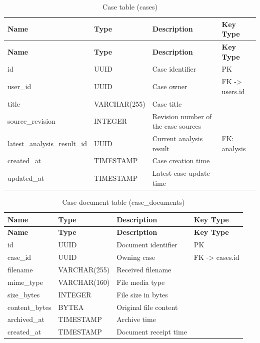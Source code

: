 \begin{longtable}{@{}>{\raggedright\arraybackslash}p{} >{\raggedright\arraybackslash}p{} >{\raggedright\arraybackslash}p{} >{\raggedright\arraybackslash}p{}@{}}
\caption{Case table (cases)}\label{tab:3-10}\\
\toprule
\textbf{Name} & \textbf{Type} & \textbf{Description} & \textbf{Key Type} \\
\midrule
\endfirsthead
\textbf{Name} & \textbf{Type} & \textbf{Description} & \textbf{Key Type} \\
\midrule
\endhead
id & UUID & Case identifier & PK \\
user\_id & UUID & Case owner & FK -> users.id \\
title & VARCHAR(255) & Case title &  \\
source\_revision & INTEGER & Revision number of the case sources &  \\
latest\_analysis\_result\_id & UUID & Current analysis result & FK: analysis \\
created\_at & TIMESTAMP & Case creation time &  \\
updated\_at & TIMESTAMP & Latest case update time &  \\
\bottomrule
\end{longtable}

\begin{longtable}{@{}>{\raggedright\arraybackslash}p{} >{\raggedright\arraybackslash}p{} >{\raggedright\arraybackslash}p{} >{\raggedright\arraybackslash}p{}@{}}
\caption{Case-document table (case\_documents)}\label{tab:3-11}\\
\toprule
\textbf{Name} & \textbf{Type} & \textbf{Description} & \textbf{Key Type} \\
\midrule
\endfirsthead
\textbf{Name} & \textbf{Type} & \textbf{Description} & \textbf{Key Type} \\
\midrule
\endhead
id & UUID & Document identifier & PK \\
case\_id & UUID & Owning case & FK -> cases.id \\
filename & VARCHAR(255) & Received filename &  \\
mime\_type & VARCHAR(160) & File media type &  \\
size\_bytes & INTEGER & File size in bytes &  \\
content\_bytes & BYTEA & Original file content &  \\
archived\_at & TIMESTAMP & Archive time &  \\
created\_at & TIMESTAMP & Document receipt time &  \\
\bottomrule
\end{longtable}

